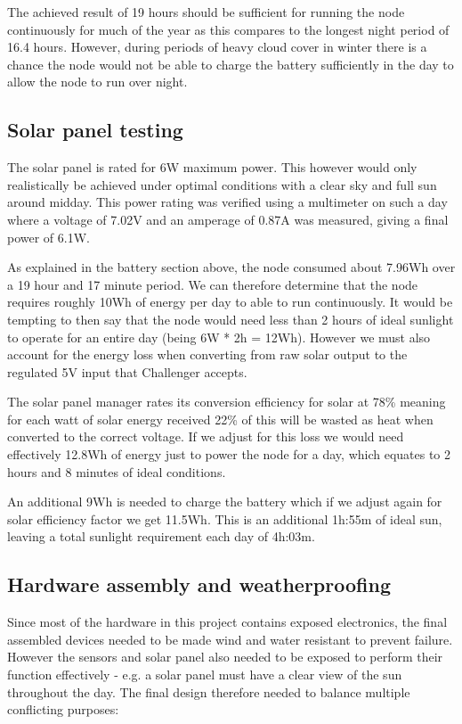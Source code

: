 The achieved result of 19 hours should be sufficient for running the node
continuously for much of the year as this compares to the longest night period
of 16.4 hours. However, during periods of heavy cloud cover in winter there is a
chance the node would not be able to charge the battery sufficiently in the day
to allow the node to run over night.

\subsection{Solar panel testing}\label{sec:solar-tests}

The solar panel is rated for 6W maximum power. This however would only
realistically be achieved under optimal conditions with a clear sky and full sun
around midday. This power rating was verified using a multimeter on such a day
where a voltage of 7.02V and an amperage of 0.87A was measured, giving a final
power of 6.1W.

As explained in the battery section above, the node consumed about 7.96Wh over a
19 hour and 17 minute period. We can therefore determine that the node requires
roughly 10Wh of energy per day to able to run continuously. It would be tempting
to then say that the node would need less than 2 hours of ideal sunlight to
operate for an entire day (being 6W * 2h = 12Wh). However we must also account
for the energy loss when converting from raw solar output to the regulated 5V
input that Challenger accepts.

The solar panel manager rates its conversion efficiency for solar at 78\%
meaning for each watt of solar energy received 22\% of this will be wasted as
heat when converted to the correct voltage. If we adjust for this loss we would
need effectively 12.8Wh of energy just to power the node for a day, which
equates to 2 hours and 8 minutes of ideal conditions.

An additional 9Wh is needed to charge the battery which if we adjust again for
solar efficiency factor we get 11.5Wh. This is an additional 1h:55m of ideal
sun, leaving a total sunlight requirement each day of 4h:03m.

\subsection{Hardware assembly and weatherproofing}

Since most of the hardware in this project contains exposed electronics, the
final assembled devices needed to be made wind and water resistant to prevent
failure. However the sensors and solar panel also needed to be exposed to
perform their function effectively - e.g. a solar panel must have a clear view
of the sun throughout the day. The final design therefore needed to balance
multiple conflicting purposes:

